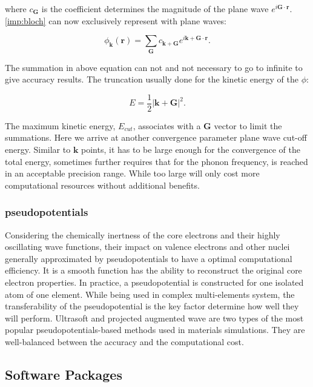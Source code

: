 where $c_{\mathbf{G}}$ is the coefficient determines the magnitude of the plane wave $e^{i\mathbf{G}\cdot\mathbf{r}}$. \autoref{imp:bloch} can now exclusively represent with plane waves:

\begin{equation}
\phi_{\mathbf{k}}(\mathbf{r})=\sum_{\mathbf{G}}c_{\mathbf{k+G}}e^{i\mathbf{k+G}\cdot\mathbf{r}}.
\end{equation}

The summation in above equation can not and not necessary to go to infinite to give accuracy results. The truncation usually done for the kinetic energy of the $\phi$:

\begin{equation}
E=\frac{1}{2}|\mathbf{k+G}|^2.
\end{equation}

The maximum kinetic energy, $E_{cut}$, associates with a $\mathbf{G}$ vector to limit the summations. Here we arrive at another convergence parameter plane wave cut-off energy. Similar to $\mathbf{k}$ points, it has to be large enough for the convergence of the total energy, sometimes further requires that for the phonon frequency, is reached in an acceptable precision range.  While too large will only cost more computational resources without additional benefits.

\subsubsection{pseudopotentials}

Considering the chemically inertness of the core electrons and their highly oscillating wave functions, their impact on valence electrons and other nuclei generally approximated by pseudopotentials to have a optimal computational efficiency. It is a smooth function has the ability to reconstruct the original core electron properties. In practice, a pseudopotential is constructed for one isolated atom of one element. While being used in complex multi-elements system, the transferability of the pseudopotential is the key factor determine how well they will perform. Ultrasoft \cite{Vanderbilt1990} and projected augmented wave \cite{bloch1994,Kresse1999} are two types of the most popular pseudopotentials-based methods used in materials simulations. They are well-balanced between the accuracy and the computational cost. 

\subsection{Software Packages}

